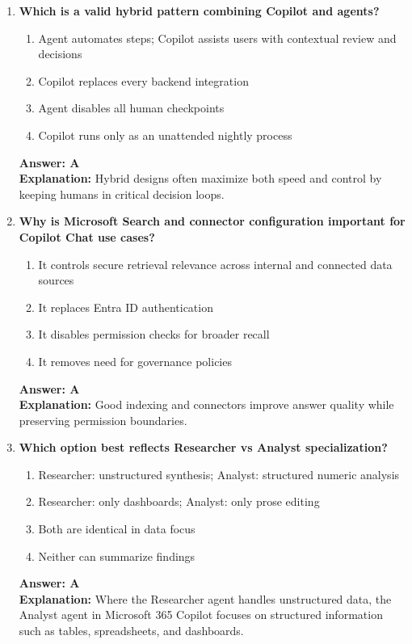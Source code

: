 \documentclass[10pt]{article}
\begin{document}
\begin{enumerate}[leftmargin=*]
\item \textbf{Which is a valid hybrid pattern combining Copilot and agents?}
\begin{enumerate}[label=\Alph*.]
  \item Agent automates steps; Copilot assists users with contextual review and decisions
  \item Copilot replaces every backend integration
  \item Agent disables all human checkpoints
  \item Copilot runs only as an unattended nightly process
\end{enumerate}
\textbf{Answer: A}\\
\textbf{Explanation:} Hybrid designs often maximize both speed and control by keeping humans in critical decision loops.

\item \textbf{Why is Microsoft Search and connector configuration important for Copilot Chat use cases?}
\begin{enumerate}[label=\Alph*.]
  \item It controls secure retrieval relevance across internal and connected data sources
  \item It replaces Entra ID authentication
  \item It disables permission checks for broader recall
  \item It removes need for governance policies
\end{enumerate}
\textbf{Answer: A}\\
\textbf{Explanation:} Good indexing and connectors improve answer quality while preserving permission boundaries.

\item \textbf{Which option best reflects Researcher vs Analyst specialization?}
\begin{enumerate}[label=\Alph*.]
  \item Researcher: unstructured synthesis; Analyst: structured numeric analysis
  \item Researcher: only dashboards; Analyst: only prose editing
  \item Both are identical in data focus
  \item Neither can summarize findings
\end{enumerate}
\textbf{Answer: A}\\
\textbf{Explanation:} Where the Researcher agent handles unstructured data, the Analyst agent in Microsoft 365 Copilot focuses on structured information such as tables, spreadsheets, and dashboards. 


\end{enumerate}
\end{document}
